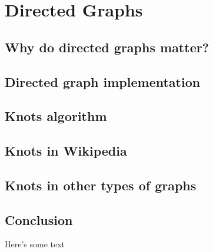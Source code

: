 \documentclass[10pt]{book}
\begin{document}
\chapter {Directed Graphs}
\section{Why do directed graphs matter?}
\section{Directed graph implementation}
\section{Knots algorithm}
\section{Knots in Wikipedia}
\section{Knots in other types of graphs}
\section{Conclusion}
Here's some text
\end{document}
